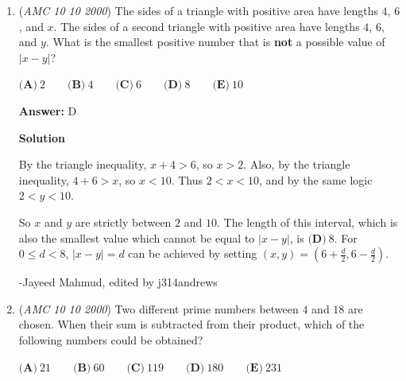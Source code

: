 \begin{enumerate}
 \textbf{Answer: }C



\textbf{Solution 1}

When $x < 2,$ $x-2$ is negative so $|x - 2| = 2-x = p$ and $x = 2-p$.

 Thus $x-p = (2-p)-p = \boxed{\mathbf{(C)}\ \ensuremath{2-2p}}$.

 



\textbf{Solution 2 (Answer Choices)}

Suppose $x = -10$.  Then $p = 12$, so $x - p = -22$.  Substituting $p = 12$ into choices (A) through (E) yields $-2$, $2$, $-22$, $22$, and $22$ respectively, so $\boxed{\mathbf{(C)}\ \ensuremath{2-2p}}$ is correct.

 -Monkey\_King, edited by j314andrews

 


	\item (\textit{AMC 10 10 2000}) The sides of a triangle with positive area have lengths $4$, $6$, and $x$. The sides of a second triangle with positive area have lengths $4$, $6$, and $y$. What is the smallest positive number that is \textbf{not} a possible value of $|x-y|$?  


 $\textbf{(A)}\ 2 \qquad\textbf{(B)}\ 4 \qquad\textbf{(C)}\ 6 \qquad\textbf{(D)}\ 8 \qquad\textbf{(E)}\ 10$

 \textbf{Answer: }D



\textbf{Solution}

By the triangle inequality, $x + 4 > 6$, so $x > 2$. Also, by the triangle inequality, $4 + 6 > x$, so $x < 10$.  Thus $2 < x < 10$, and by the same logic $2 < y < 10$.  

 So $x$ and $y$ are strictly between $2$ and $10$.  The length of this interval, which is also the smallest value which cannot be equal to $|x-y|$, is $\boxed{\textbf{(D)}\ 8}$.  For $0 \leq d < 8$, $|x-y|=d$ can be achieved by setting $(x, y) = \left(6+\frac{d}{2}, 6-\frac{d}{2}\right)$.

 -Jayeed Mahmud, edited by j314andrews

 


	\item (\textit{AMC 10 10 2000}) Two different prime numbers between $4$ and $18$ are chosen. When their sum is subtracted from their product, which of the following numbers could be obtained?


 $\textbf{(A)}\ 21 \qquad\textbf{(B)}\ 60 \qquad\textbf{(C)}\ 119 \qquad\textbf{(D)}\ 180 \qquad\textbf{(E)}\ 231$


\end{enumerate}

